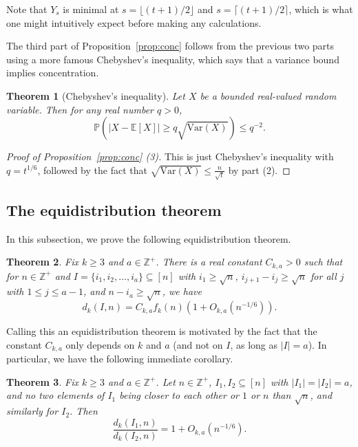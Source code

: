 \documentclass{amsart}
\newtheorem{theorem}{Theorem}[section]
\theoremstyle{definition}
\newcommand{\Var}{\mathrm{Var}}
\newcommand{\Cov}{\mathrm{Cov}}
\begin{document}
Note that $Y_s$ is minimal at $s=\lfloor (t+1)/2 \rfloor$ and $s=\lceil (t+1)/2\rceil$, which is what one might intuitively expect before making any calculations.

The third part of Proposition~\ref{prop:conc} follows from the previous two parts using a more famous Chebyshev's inequality, which says that a variance bound implies concentration. 

\begin{theorem}[Chebyshev's inequality] Let $X$ be a bounded real-valued random variable. Then for any real number $q>0$,
\[\mathbb{P}\left(|X-\mathbb{E}[X]|\geq q\sqrt{\Var(X)}\right)\leq q^{-2}.\]
\end{theorem}

\begin{proof}[Proof of Proposition~\ref{prop:conc} (3)] This is just Chebyshev's inequality with $q=t^{1/6}$, followed by the fact that $\sqrt{\Var(X)}\leq \frac{n}{\sqrt{t}}$ by part (2).
\end{proof}

\subsection{The equidistribution theorem} In this subsection, we prove the following equidistribution theorem.

\begin{theorem}\label{thm:equistrong}
Fix $k\geq 3$ and $a\in \mathbb{Z}^+$. There is a real constant $C_{k,a}>0$ such that for $n\in \mathbb{Z}^+$ and $I=\{i_1,i_2,\ldots, i_a\}\subseteq [n]$ with $i_1\geq \sqrt{n}$, $i_{j+1}-i_j\geq \sqrt{n}$ for all $j$ with $1\leq j\leq a-1$, and $n-i_a\geq \sqrt{n}$, we have
\[d_k(I,n)=C_{k,a} f_k(n)\left(1+O_{k,a}\left(n^{-1/6}\right)\right).\]
\end{theorem}

Calling this an equidistribution theorem is motivated by the fact that the constant $C_{k,a}$ only depends on $k$ and $a$ (and not on $I$, as long as $|I|=a$). In particular, we have the following immediate corollary.
\begin{theorem}\label{thm:equi}
Fix $k\geq 3$ and $a\in \mathbb{Z}^+$. Let $n\in \mathbb{Z}^+$, $I_1,I_2\subseteq [n]$ with $|I_1|=|I_2|=a$, and no two elements of $I_1$ being closer to each other or $1$ or $n$ than $\sqrt{n}$, and similarly for $I_2$. Then 
\[\frac{d_k(I_1,n)}{d_k(I_2,n)}=1+O_{k,a}\left(n^{-1/6}\right).\]
\end{theorem}
\end{document}

